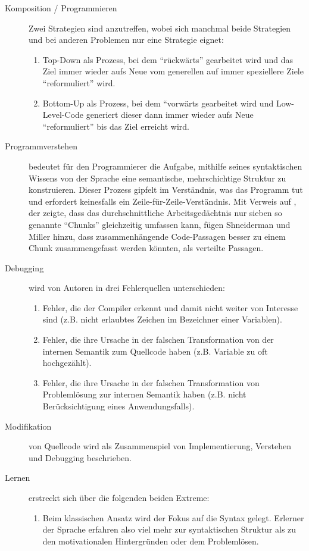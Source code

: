 \begin{description}
\item[Komposition / Programmieren]
Zwei Strategien sind anzutreffen, wobei sich manchmal beide Strategien und bei anderen Problemen nur eine Strategie eignet:
\begin{enumerate}
\item Top-Down als Prozess, bei dem ``rückwärts'' gearbeitet wird und das Ziel immer wieder aufs Neue vom generellen auf immer speziellere Ziele ``reformuliert'' wird.
\item Bottom-Up als Prozess, bei dem ``vorwärts gearbeitet wird und Low-Level-Code generiert dieser dann immer wieder aufs Neue ``reformuliert'' bis das Ziel erreicht wird.
\end{enumerate}
\item[Programmverstehen]
bedeutet für den Programmierer die Aufgabe, mithilfe seines syntaktischen Wissens von der Sprache eine semantische, mehrschichtige Struktur zu konstruieren. Dieser Prozess gipfelt im Verständnis, was das Programm tut und erfordert keinesfalls ein Zeile-für-Zeile-Verständnis. Mit Verweis auf \cite{Miller:1956dz}, der zeigte, dass das durchschnittliche Arbeitsgedächtnis nur sieben so genannte ``Chunks'' gleichzeitig umfassen kann, fügen Shneiderman und Miller hinzu, dass zusammenhängende Code-Passagen besser zu einem Chunk zusammengefasst werden könnten, als verteilte Passagen.
\item[Debugging]
wird von Autoren in drei Fehlerquellen unterschieden:
\begin{enumerate}
\item Fehler, die der Compiler erkennt und damit nicht weiter von Interesse sind (z.B. nicht erlaubtes Zeichen im Bezeichner einer Variablen).
\item Fehler, die ihre Ursache in der falschen Transformation von der internen Semantik zum Quellcode haben (z.B. Variable zu oft hochgezählt).
\item Fehler, die ihre Ursache in der falschen Transformation von Problemlösung zur internen Semantik haben (z.B. nicht Berücksichtigung eines Anwendungsfalls).
\end{enumerate}
\item[Modifikation]
von Quellcode wird als Zusammenspiel von Implementierung, Verstehen und Debugging beschrieben.
\item[Lernen]
erstreckt sich über die folgenden beiden Extreme:
\begin{enumerate}
\item Beim klassischen Ansatz wird der Fokus auf die Syntax gelegt. Erlerner der Sprache erfahren also viel mehr zur syntaktischen Struktur als zu den motivationalen Hintergründen oder dem Problemlösen.

\end{enumerate}
\end{description}
